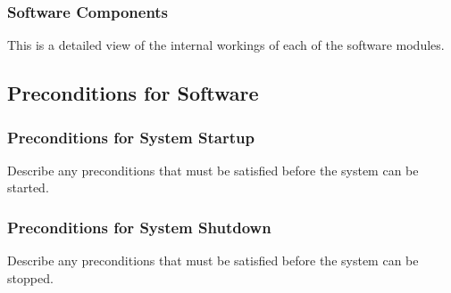 \documentclass[MTRX3700report.tex]{subfiles}
\begin{document}
\subsubsection{Software Components}
This is a detailed view of the internal workings of each of the software modules.

\subsection{Preconditions for Software}
\subsubsection{Preconditions for System Startup}
Describe any preconditions that must be satisfied before the system can be started.
\subsubsection{Preconditions for System Shutdown}
Describe any preconditions that must be satisfied before the system can be stopped.
\end{document}
